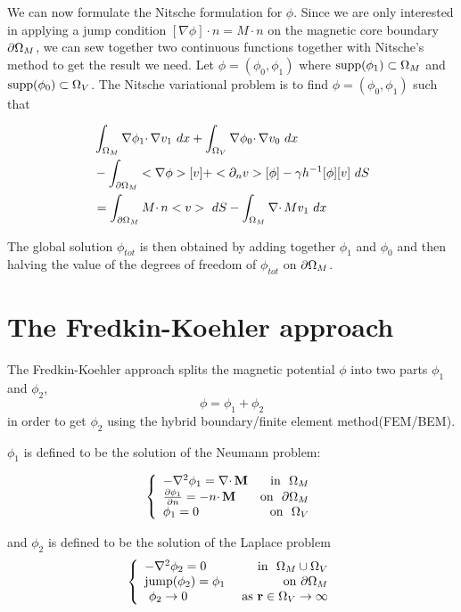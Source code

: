 \documentclass[12pt,a4paper,notitlepage]{article}
\begin{document}
We can now formulate the Nitsche formulation for $\phi$. Since we are only interested in applying a jump condition
$ [\nabla \phi]  \cdotp n =  M \cdotp n $ on the magnetic core boundary $\partial \Omega_M$, we can sew together two continuous functions
together with Nitsche's method to get the result we need. Let $\phi = (\phi_0,\phi_1)$ where
$\operatorname{supp}(\phi_1) \subset \Omega_M$ and $\operatorname{supp}(\phi_0) \subset \Omega_V$. The Nitsche variational problem is to find  $\phi = (\phi_0,\phi_1)$ such that

\begin{align*}
&\int_{\Omega_M} \nabla \phi_1 \cdotp \nabla v_1 \ dx + \int_{\Omega_V} \nabla \phi_0 \cdotp \nabla v_0 \ dx \\
&- \int_{\partial \Omega_M} <\nabla \phi> [v]  + <\partial_n v> [\phi] - \gamma h^{-1} [\phi][v] \ dS \\
&= \int_{\partial \Omega_M} M  \cdotp n <v> \ dS - \int_{\Omega_M} \nabla \cdotp M v_1 \ dx
\end{align*}

The global solution $\phi_{tot}$ is then obtained by adding together $\phi_1$ and $\phi_0$ and then halving the value
of the degrees of freedom of $\phi_{tot}$ on $\partial \Omega_M$.


\section{The Fredkin-Koehler approach} 
The Fredkin-Koehler approach splits the magnetic potential $\phi$ into two parts $\phi_1$ and $\phi_2$, 
\[ \phi = \phi_1 + \phi_2 \]
\noindent in order to get $\phi_2$ using the hybrid boundary/finite element method(FEM/BEM).

\noindent $\phi_1$ is defined to be the solution of the Neumann problem:

\[ 
\left\{
\begin{array}{lr}
- \nabla^2 \phi_1 = \nabla \cdotp \mathbf{M}  & \mbox{in } \ \Omega_M \\
 \frac{\partial \phi_1}{\partial n}  = -n \cdotp \mathbf{M} & \mbox{on } \  \partial \Omega_M \\
 \phi_1 = 0 & \mbox{on} \ \ \Omega_V
\end{array}
\right. 
\]


\noindent and $\phi_2$ is defined to be the solution of the Laplace problem
\[ 
\left\{
\begin{array}{lr}
- \nabla^2 \phi_2 = 0 & \mbox{in } \ \Omega_M \cup \Omega_V \\
\mbox{jump}(\phi_2) = \phi_1 & \mbox{on} \ \partial \Omega_M \\
\ \phi_2 \rightarrow 0 & \ \mbox{as} \ \mathbf{r} \in \Omega_V \rightarrow \infty
\end{array}
\right. 
\]
\end{document}
